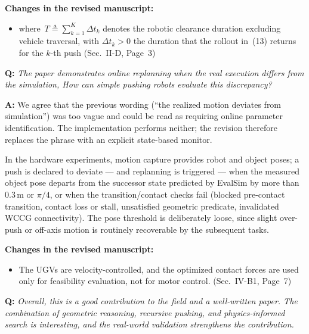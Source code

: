 \documentclass[11pt]{article}
\newcommand{\change}[1]{{\color{blue}#1}}
\begin{document}
\noindent\textbf{Changes in the revised manuscript:}

\begin{itemize}
\item \change{where~$T\triangleq\sum_{k=1}^{K}\Delta t_k$ denotes the robotic clearance duration excluding vehicle traversal, with $\Delta t_k>0$ the duration that the rollout in~(13) returns for the $k$-th push} (Sec.~II-D, Page~3)
\end{itemize}

\begin{shaded*}
\noindent \textbf{Q:}
{\itshape
The paper demonstrates online replanning when the real execution
differs from the simulation, How can simple pushing robots evaluate
this discrepancy?
}
\end{shaded*}

\noindent \textbf{A:}
We agree that the previous wording (``the realized motion deviates from simulation'') was too vague
and could be read as requiring online parameter identification. The implementation performs
neither; the revision therefore replaces the phrase with an explicit state-based monitor.

In the hardware experiments, motion capture provides robot and object poses; a push is declared to
deviate --- and replanning is triggered --- when the measured object pose departs from the successor
state predicted by EvalSim by more than $0.3$\,m or $\pi/4$, or when the transition/contact checks
fail (blocked pre-contact transition, contact loss or stall, unsatisfied geometric predicate,
invalidated
WCCG connectivity).
The pose threshold is deliberately loose, since slight over-push or off-axis motion is routinely
recoverable by the subsequent tasks. 

\noindent\textbf{Changes in the revised manuscript:}

\begin{itemize}
\item \change{The UGVs are velocity-controlled, and the optimized contact forces are used only for feasibility evaluation, not for motor control.} (Sec.~IV-B1, Page~7)
\end{itemize}

\begin{shaded*}
\noindent \textbf{Q:}
{\itshape
Overall, this is a good contribution to the field and a well-written
paper. The combination of geometric reasoning, recursive pushing, and
physics-informed search is interesting, and the real-world validation
strengthens the contribution.
}
\end{shaded*}
\end{document}
